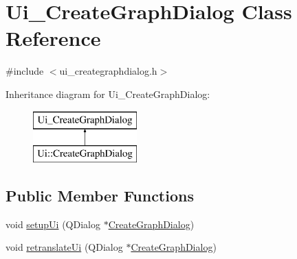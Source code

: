 \hypertarget{class_ui___create_graph_dialog}{}\section{Ui\+\_\+\+Create\+Graph\+Dialog Class Reference}
\label{class_ui___create_graph_dialog}


{\ttfamily \#include $<$ui\+\_\+creategraphdialog.\+h$>$}

Inheritance diagram for Ui\+\_\+\+Create\+Graph\+Dialog\+:\begin{figure}[H]
\begin{center}
\leavevmode
\includegraphics[height=2.000000cm]{d4/d2f/class_ui___create_graph_dialog}
\end{center}
\end{figure}
\subsection*{Public Member Functions}
\begin{DoxyCompactItemize}
\item 
void \mbox{\hyperlink{class_ui___create_graph_dialog_a6628f034831603ac0b62e061de339f30}{setup\+Ui}} (Q\+Dialog $\ast$\mbox{\hyperlink{class_create_graph_dialog}{Create\+Graph\+Dialog}})
\item 
void \mbox{\hyperlink{class_ui___create_graph_dialog_a497ef78dbefd8352ed5cf2373fc03b20}{retranslate\+Ui}} (Q\+Dialog $\ast$\mbox{\hyperlink{class_create_graph_dialog}{Create\+Graph\+Dialog}})
\end{DoxyCompactItemize}
